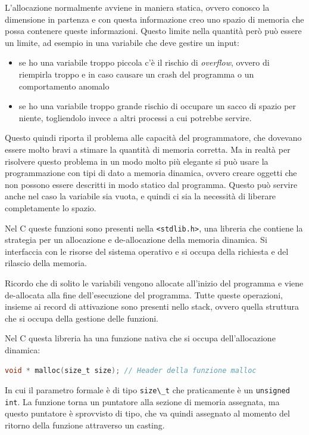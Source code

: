 \documentclass[
  paper=a4,
  oneside  ,captions=tableheading
]{scrbook}
\newcommand{\passthrough}[1]{#1}
\providecommand{\tightlist}{%
  \setlength{\itemsep}{0pt}\setlength{\parskip}{0pt}}
\begin{document}
L'allocazione normalmente avviene in maniera statica, ovvero conosco la
dimensione in partenza e con questa informazione creo uno spazio di
memoria che possa contenere queste informazioni. Questo limite nella
quantità però può essere un limite, ad esempio in una variabile che deve
gestire un input:

\begin{itemize}
\tightlist
\item
  se ho una variabile troppo piccola c'è il rischio di \emph{overflow},
  ovvero di riempirla troppo e in caso causare un crash del programma o
  un comportamento anomalo
\item
  se ho una variabile troppo grande rischio di occupare un sacco di
  spazio per niente, togliendolo invece a altri processi a cui potrebbe
  servire.
\end{itemize}

Questo quindi riporta il problema alle capacità del programmatore, che
dovevano essere molto bravi a stimare la quantità di memoria corretta.
Ma in realtà per risolvere questo problema in un modo molto più elegante
si può usare la programmazione con tipi di dato a memoria dinamica,
ovvero creare oggetti che non possono essere descritti in modo statico
dal programma. Questo può servire anche nel caso la variabile sia vuota,
e quindi ci sia la necessità di liberare completamente lo spazio.

Nel C queste funzioni sono presenti nella
\passthrough{\lstinline!<stdlib.h>!}, una libreria che contiene la
strategia per un allocazione e de-allocazione della memoria dinamica. Si
interfaccia con le risorse del sistema operativo e si occupa della
richiesta e del rilascio della memoria.

Ricordo che di solito le variabili vengono allocate all'inizio del
programma e viene de-allocata alla fine dell'esecuzione del programma.
Tutte queste operazioni, insieme ai record di attivazione sono presenti
nello stack, ovvero quella struttura che si occupa della gestione delle
funzioni.

Nel C questa libreria ha una funzione nativa che si occupa
dell'allocazione dinamica:

\begin{lstlisting}[language=C]
void * malloc(size_t size); // Header della funzione malloc
\end{lstlisting}

In cui il parametro formale è di tipo \passthrough{\lstinline!size\_t!}
che praticamente è un \passthrough{\lstinline!unsigned int!}. La
funzione torna un puntatore alla sezione di memoria assegnata, ma questo
puntatore è sprovvisto di tipo, che va quindi assegnato al momento del
ritorno della funzione attraverso un casting.
\end{document}
